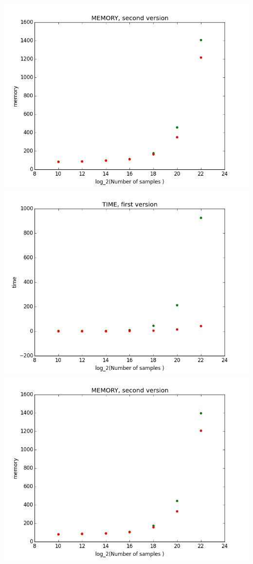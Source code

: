 \documentclass[12pt]{article}
\begin{document}
\begin{table}
\includegraphics[scale=0.4]{memory_FirstVersion.png}
\includegraphics[scale=0.4]{time_FirstVersion.png}
\includegraphics[scale=0.4]{memory_SecondVersion.png}

\end{table}
\end{document}
